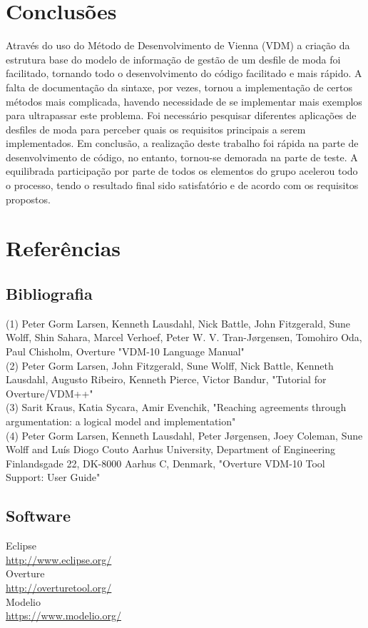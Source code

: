 \documentclass{article}
\begin{document}
\section{Conclusões}
Através do uso do Método de Desenvolvimento de Vienna (VDM) a criação da estrutura base do modelo de informação de gestão de um desfile de moda foi facilitado, tornando todo o desenvolvimento do código facilitado e mais rápido. A falta de documentação da sintaxe, por vezes, tornou a implementação de certos métodos mais complicada, havendo necessidade de se implementar mais exemplos para ultrapassar este problema.
\newline
Foi necessário pesquisar diferentes aplicações de desfiles de moda para perceber quais os requisitos principais a serem implementados. 
\newline
Em conclusão, a realização deste trabalho foi rápida na parte de desenvolvimento de código, no entanto, tornou-se demorada na parte de teste. A equilibrada participação por parte de todos os elementos do grupo acelerou todo o processo, tendo o resultado final sido satisfatório e de acordo com os requisitos propostos.
\section{Referências}
\subsection{Bibliografia}
\noindent
(1) Peter Gorm Larsen, Kenneth Lausdahl, Nick Battle, John Fitzgerald, Sune Wolff, Shin Sahara, Marcel Verhoef, Peter W. V. Tran-Jørgensen, Tomohiro Oda, Paul Chisholm, Overture "VDM-10 Language Manual"\\

\noindent
(2) Peter Gorm Larsen, John Fitzgerald, Sune Wolff, Nick Battle, Kenneth Lausdahl, Augusto Ribeiro, Kenneth Pierce, Victor Bandur, "Tutorial for Overture/VDM++"\\

\noindent
(3) Sarit Kraus, Katia Sycara, Amir Evenchik, "Reaching agreements through argumentation: a logical model and implementation"\\

\noindent
(4) Peter Gorm Larsen, Kenneth Lausdahl, Peter Jørgensen, Joey Coleman, Sune Wolff and Luís Diogo Couto Aarhus University, Department of Engineering Finlandsgade 22, DK-8000 Aarhus C, Denmark, "Overture VDM-10 Tool Support: User Guide"\\
\subsection{Software}

Eclipse \\
\vspace{3mm}\url{http://www.eclipse.org/} \\
Overture \\
\vspace{3mm}\url{http://overturetool.org/} \\
Modelio \\
\vspace{3mm}\url{https://www.modelio.org/} \\
\end{document}
